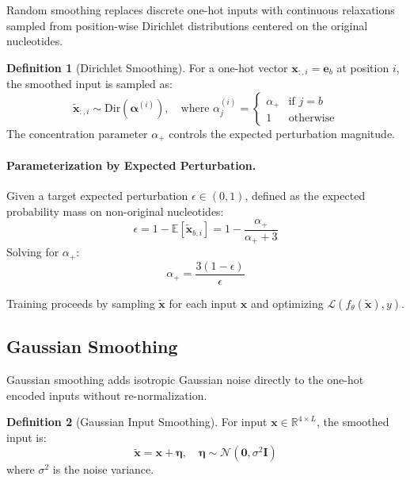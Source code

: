 \documentclass[11pt]{article}
\newcommand{\x}{\mathbf{x}}
\newcommand{\loss}{\mathcal{L}}
\newcommand{\model}{f_\theta}
\newcommand{\E}{\mathbb{E}}
\newcommand{\R}{\mathbb{R}}
\newcommand{\onehot}{\mathbf{e}}
\newcommand{\Dir}{\mathrm{Dir}}
\newcommand{\Normal}{\mathcal{N}}
\theoremstyle{definition}
\newtheorem{definition}{Definition}
\begin{document}
Random smoothing replaces discrete one-hot inputs with continuous relaxations sampled from position-wise Dirichlet distributions centered on the original nucleotides.

\begin{definition}[Dirichlet Smoothing]
For a one-hot vector $\x_{:,i} = \onehot_b$ at position $i$, the smoothed input is sampled as:
\begin{equation}
    \tilde{\x}_{:,i} \sim \Dir(\bm{\alpha}^{(i)}), \quad \text{where } \alpha^{(i)}_j =
    \begin{cases}
        \alpha_+ & \text{if } j = b \\
        1 & \text{otherwise}
    \end{cases}
\end{equation}
The concentration parameter $\alpha_+$ controls the expected perturbation magnitude.
\end{definition}

\paragraph{Parameterization by Expected Perturbation.}
Given a target expected perturbation $\epsilon \in (0,1)$, defined as the expected probability mass on non-original nucleotides:
\begin{equation}
    \epsilon = 1 - \E[\tilde{\x}_{b,i}] = 1 - \frac{\alpha_+}{\alpha_+ + 3}
\end{equation}
Solving for $\alpha_+$:
\begin{equation}
    \alpha_+ = \frac{3(1 - \epsilon)}{\epsilon}
\end{equation}

Training proceeds by sampling $\tilde{\x}$ for each input $\x$ and optimizing $\loss(\model(\tilde{\x}), y)$.

\subsection{Gaussian Smoothing}

Gaussian smoothing adds isotropic Gaussian noise directly to the one-hot encoded inputs without re-normalization.

\begin{definition}[Gaussian Input Smoothing]
For input $\x \in \R^{4 \times L}$, the smoothed input is:
\begin{equation}
    \tilde{\x} = \x + \bm{\eta}, \quad \bm{\eta} \sim \Normal(\mathbf{0}, \sigma^2 \mathbf{I})
\end{equation}
where $\sigma^2$ is the noise variance.
\end{definition}
\end{document}
